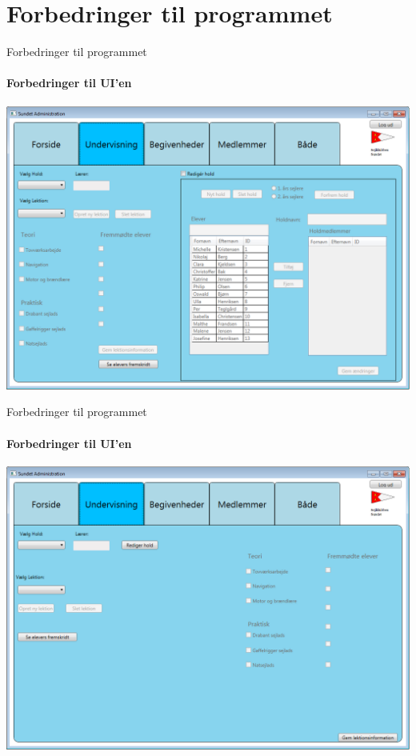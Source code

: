 \section{Forbedringer til programmet}
\begin{frame}{Forbedringer til programmet}
\framesubtitle{Forbedringer til UI'en}
 \includegraphics[width=1\textwidth]{images/undervisning.png}
 \end{frame}
 \begin{frame}{Forbedringer til programmet}
 \framesubtitle{Forbedringer til UI'en}
 \includegraphics[width=1\textwidth]{images/undervisningClean.png}
\end{frame}
